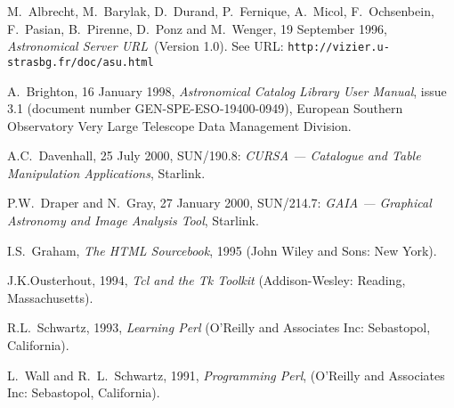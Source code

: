 \documentclass[twoside,11pt]{article}
\newcommand{\htmladdnormallink}[2]{#1}
\newcommand{\xref}[3]{#1}
\renewcommand{\_}{\texttt{\symbol{95}}}
\begin{document}
\newpage
{}
\begin{thebibliography}{99}

   M.~Albrecht, M.~Barylak, D.~Durand, P.~Fernique,
   A.~Micol, F.~Ochsenbein, F.~Pasian, B.~Pirenne, D.~Ponz and
   M.~Wenger, 19 September 1996, {\it Astronomical Server URL}\,
   (Version 1.0).  See URL: \htmladdnormallink{
   {\tt http://vizier.u-strasbg.fr/doc/asu.html}}
   {http://vizier.u-strasbg.fr/doc/asu.html}

   A.~Brighton, 16 January 1998, {\it Astronomical
   Catalog Library User Manual}, issue 3.1 (document number
   GEN-SPE-ESO-19400-0949), European Southern Observatory Very Large
   Telescope Data Management Division.

   A.C.~Davenhall, 25 July 2000,
   \xref{SUN/190.8}{sun190}{}: {\it CURSA --- Catalogue and Table
    Manipulation Applications}, Starlink.

   P.W.~Draper and N.~Gray, 27 January 2000,
   \xref{SUN/214.7}{sun214}{}: {\it GAIA --- Graphical Astronomy and
   Image Analysis Tool}, Starlink.

   I.S.~Graham, {\it The HTML Sourcebook}, 1995 (John
   Wiley and Sons: New York).

   J.K.Ousterhout, 1994, {\it Tcl and the Tk
   Toolkit}\/ (Addison-Wesley: Reading, Massachusetts).

   R.L.~Schwartz, 1993, {\it Learning Perl}
   (O'Reilly and Associates Inc: Sebastopol, California).

   L.~Wall and R.~L.~Schwartz, 1991, {\it Programming
   Perl}, (O'Reilly and Associates Inc: Sebastopol, California).

\end{thebibliography}

\typeout{  }
\typeout{*****************************************************}
\typeout{  }
\typeout{  }
\typeout{*****************************************************}
\typeout{  }
\end{document}
